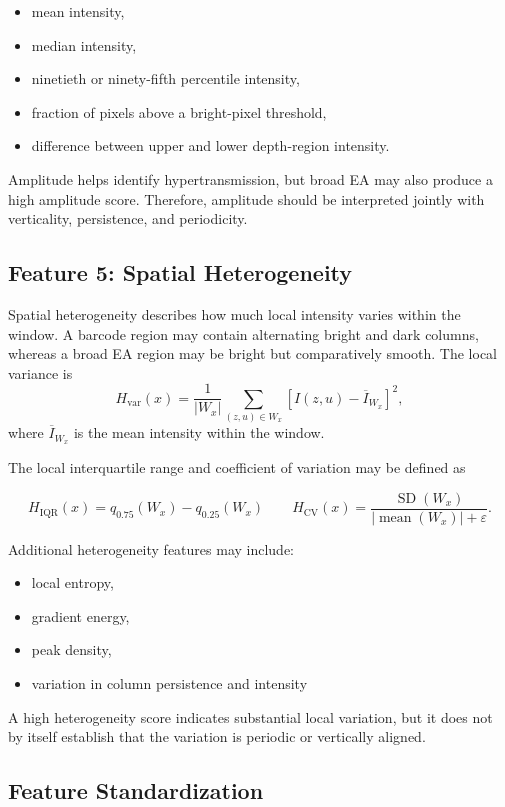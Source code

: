 \documentclass[11pt]{article}
\begin{document}
\begin{itemize}
    \item mean intensity,
    \item median intensity,
    \item ninetieth or ninety-fifth percentile intensity,
    \item fraction of pixels above a bright-pixel threshold,
    \item difference between upper and lower depth-region intensity.
\end{itemize}

Amplitude helps identify hypertransmission, but broad EA may also produce a
high amplitude score. Therefore, amplitude should be interpreted jointly with
verticality, persistence, and periodicity.


\subsection{Feature 5: Spatial Heterogeneity}

Spatial heterogeneity describes how much local intensity varies within the
window. A barcode region may contain alternating bright and dark columns,
whereas a broad EA region may be bright but comparatively smooth.
The local variance is
\[
H_{\mathrm{var}}(x)
=
\frac{1}{|W_x|}
\sum_{(z,u)\in W_x}
\left[
I(z,u)-\overline{I}_{W_x}
\right]^2,
\]
where \(\overline{I}_{W_x}\) is the mean intensity within the window.

The local interquartile range and coefficient of variation may be defined as

\[
H_{\mathrm{IQR}}(x)
=
q_{0.75}(W_x)-q_{0.25}(W_x)
\qquad 
H_{\mathrm{CV}}(x)
=
\frac{
\operatorname{SD}(W_x)
}{
\left|
\operatorname{mean}(W_x)
\right|
+\varepsilon
}.
\]


Additional heterogeneity features may include:

\begin{itemize}
    \item local entropy,
    \item gradient energy,
    \item peak density,
    \item variation in column persistence and intensity
\end{itemize}

A high heterogeneity score indicates substantial local variation, but it does
not by itself establish that the variation is periodic or vertically aligned.


\subsection{Feature Standardization}
\end{document}
